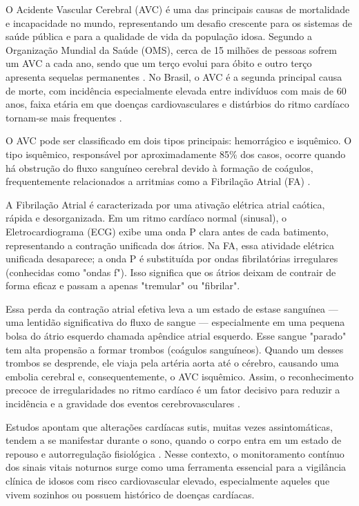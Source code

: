 O Acidente Vascular Cerebral (AVC) é uma das principais causas de mortalidade e incapacidade no mundo, representando um desafio crescente para os sistemas de saúde pública e para a qualidade de vida da população idosa. Segundo a Organização Mundial da Saúde (OMS), cerca de 15 milhões de pessoas sofrem um AVC a cada ano, sendo que um terço evolui para óbito e outro terço apresenta sequelas permanentes \parencite{WHO2023}. No Brasil, o AVC é a segunda principal causa de morte, com incidência especialmente elevada entre indivíduos com mais de 60 anos, faixa etária em que doenças cardiovasculares e distúrbios do ritmo cardíaco tornam-se mais frequentes \parencite{MinisterioSaude2022}.

O AVC pode ser classificado em dois tipos principais: hemorrágico e isquêmico. O tipo isquêmico, responsável por aproximadamente 85\% dos casos, ocorre quando há obstrução do fluxo sanguíneo cerebral devido à formação de coágulos, frequentemente relacionados a arritmias como a Fibrilação Atrial (FA) \parencite{JAMAAtrialFib,WJGNetStrokeRisk}. 

A Fibrilação Atrial é caracterizada por uma ativação elétrica atrial caótica, rápida e desorganizada. Em um ritmo cardíaco normal (sinusal), o Eletrocardiograma (ECG) exibe uma onda P clara antes de cada batimento, representando a contração unificada dos átrios. Na FA, essa atividade elétrica unificada desaparece; a onda P é substituída por ondas fibrilatórias irregulares (conhecidas como "ondas f"). Isso significa que os átrios deixam de contrair de forma eficaz e passam a apenas "tremular" ou "fibrilar".

Essa perda da contração atrial efetiva leva a um estado de estase sanguínea — uma lentidão significativa do fluxo de sangue — especialmente em uma pequena bolsa do átrio esquerdo chamada apêndice atrial esquerdo. Esse sangue "parado" tem alta propensão a formar trombos (coágulos sanguíneos). Quando um desses trombos se desprende, ele viaja pela artéria aorta até o cérebro, causando uma embolia cerebral e, consequentemente, o AVC isquêmico. Assim, o reconhecimento precoce de irregularidades no ritmo cardíaco é um fator decisivo para reduzir a incidência e a gravidade dos eventos cerebrovasculares \parencite{PubMedSAFARIS}.

Estudos apontam que alterações cardíacas sutis, muitas vezes assintomáticas, tendem a se manifestar durante o sono, quando o corpo entra em um estado de repouso e autorregulação fisiológica \parencite{SnifBrasil2023,JMIRContactless2024}. Nesse contexto, o monitoramento contínuo dos sinais vitais noturnos surge como uma ferramenta essencial para a vigilância clínica de idosos com risco cardiovascular elevado, especialmente aqueles que vivem sozinhos ou possuem histórico de doenças cardíacas.

